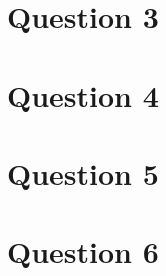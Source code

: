 \documentclass{article} %
\begin{document}
\newpage
\section{Question 3}



\newpage
\section{Question 4}


\newpage
\section{Question 5}


\newpage
\section{Question 6}
\end{document}
